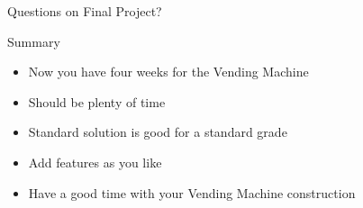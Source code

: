 \begin{frame}[fragile]{Questions on Final Project?}
\end{frame}


\begin{frame}[fragile]{Summary}
\begin{itemize}
\item Now you have four weeks for the Vending Machine
\item Should be plenty of time
\item Standard solution is good for a standard grade
\item Add features as you like
\item Have a good time with your Vending Machine construction
\end{itemize}
\end{frame}





